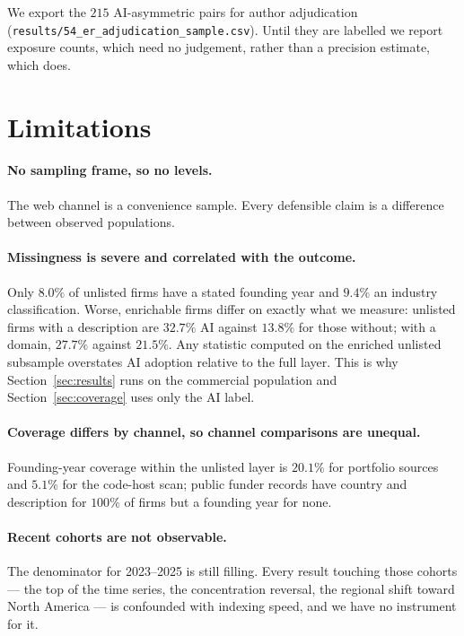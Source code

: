 \documentclass[11pt]{article}
\begin{document}
We export the $215$ AI-asymmetric pairs for author adjudication
(\texttt{results/54\_er\_adjudication\_sample.csv}). Until they are labelled we
report exposure counts, which need no judgement, rather than a precision
estimate, which does.

\section{Limitations}
\label{sec:limits}

\paragraph{No sampling frame, so no levels.} The web channel is a convenience
sample. Every defensible claim is a difference between observed populations.

\paragraph{Missingness is severe and correlated with the outcome.} Only $8.0\%$
of unlisted firms have a stated founding year and $9.4\%$ an industry
classification. Worse, enrichable firms differ on exactly what we measure:
unlisted firms with a description are $32.7\%$ AI against $13.8\%$ for those
without; with a domain, $27.7\%$ against $21.5\%$. Any statistic computed on
the enriched unlisted subsample overstates AI adoption relative to the full
layer. This is why Section~\ref{sec:results} runs on the commercial population
and Section~\ref{sec:coverage} uses only the AI label.

\paragraph{Coverage differs by channel, so channel comparisons are unequal.}
Founding-year coverage within the unlisted layer is $20.1\%$ for portfolio
sources and $5.1\%$ for the code-host scan; public funder records have country
and description for $100\%$ of firms but a founding year for none.

\paragraph{Recent cohorts are not observable.} The denominator for 2023--2025
is still filling. Every result touching those cohorts --- the top of the time
series, the concentration reversal, the regional shift toward North America ---
is confounded with indexing speed, and we have no instrument for it.
\end{document}
